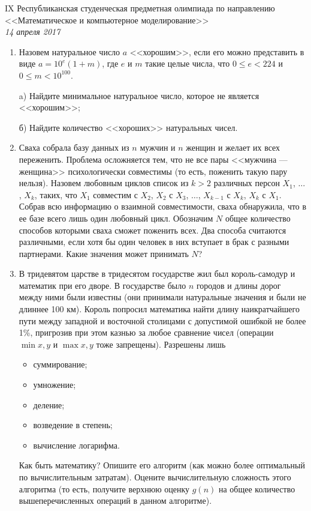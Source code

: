\documentclass[12pt, a4paper]{article}
\newcommand{\head}[4]
{
	\fancyhf{}
	\pagestyle{fancy}
	\chead{#3, #4}

	\begin{center}
	\begin{large}
	#1 \\
	\textit{#2} \\
	\end{large}
	\end{center}

}
\begin{document}
\head{IX Республиканская студенческая предметная олимпиада по направлению \\ <<Математическое и компьютерное моделирование>>}{14 апреля 2017}{Назарбаев Университет}{г. Астана}

\begin{enumerate}
\item Назовем натуральное число $a$ <<хорошим>>, если его можно представить в виде $a = 10^e (1+m)$, где $e$ и $m$ такие целые числа, что $0 \leqslant e < 224$ и $0 \leqslant m < 10^{100}$.

a) Найдите минимальное натуральное число, которое не является <<хорошим>>;

б) Найдите количество <<хороших>> натуральных чисел.

\item Сваха собрала базу данных из $n$ мужчин и $n$ женщин и желает их всех
переженить. Проблема осложняется тем, что не все пары <<мужчина --- женщина>> психологически совместимы (то есть, поженить такую пару нельзя). Назовем любовным циклов список из $k > 2$ различных персон $X_1$, $\dots$, $X_k$, таких, что $X_1$ совместим с $X_2$, $X_2$ с $X_3$, $\dots$, $X_{k-1}$ с $X_k$, $X_k$ с $X_1$. Собрав всю информацию о взаимной совместимости, сваха обнаружила, что в ее базе всего лишь один любовный цикл. Обозначим $N$ общее количество способов которыми сваха сможет поженить всех. Два способа считаются различными, если хотя бы один человек в них вступает в брак с разными партнерами. Какие значения может принимать $N$?

\item В тридевятом царстве в тридесятом государстве жил был король-самодур и математик при его дворе. В государстве было $n$ городов и длины дорог между ними были известны (они принимали натуральные значения и были не длиннее 100 км). Король попросил математика найти длину наикратчайшего пути между западной и восточной столицами с допустимой ошибкой не более 1\%, пригрозив при этом казнью за любое сравнение чисел (операции $\min{x, y}$ и $\max{x, y}$ тоже запрещены). Разрешены лишь 
\begin{itemize}
\item суммирование;
\item умножение;
\item деление;
\item возведение в степень;
\item вычисление логарифма.
\end{itemize}
Как быть математику? Опишите его алгоритм (как можно более оптимальный по вычислительным затратам). Оцените вычислительную сложность этого алгоритма (то есть, получите верхнюю оценку $g(n)$ на общее количество вышеперечисленных операций в данном алгоритме).


\end{enumerate}
\end{document}
